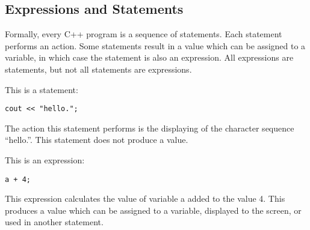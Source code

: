 \documentclass[a4paper,12pt]{article}
\begin{document}
\subsection*{Expressions and Statements}

Formally, every C++ program is a sequence of statements. Each statement performs an action. Some statements result in a value which can be assigned to a variable, in which case the statement is also an expression. All expressions are statements, but not all statements are expressions. 

This is a statement: 

\begin{lstlisting}
cout << "hello.";
\end{lstlisting}

The action this statement performs is the displaying of the character sequence ``hello.''. This statement does not produce a value.

This is an expression:

\begin{lstlisting}
a + 4;
\end{lstlisting}

This expression calculates the value of variable a added to the value 4. This produces a value which can be assigned to a variable, displayed to the screen, or used in another statement. 
\end{document}
